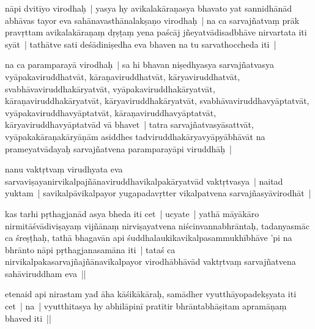 \documentclass[article,12pt,a4paper]{memoir}%
\newcounter{parCount}
\begin{document}
	  \pstart \leavevmode%
	\label{thakur75-23.28}nāpi dvitīyo virodhaḥ | yasya hy avikalakāraṇasya bhavato yat sannidhānād abhāvas tayor eva sahānavasthānalakṣaṇo virodhaḥ | na ca sarvajñatvaṃ prāk pravṛttam avikalakāraṇaṃ dṛṣṭaṃ yena paścāj jñeyatvādisadbhāve nirvartata iti syāt | tathātve sati deśādiniṣedha eva bhaven na tu sarvathoccheda iti | 
	{}
	\pend%
      

	  \pstart \leavevmode%
	\label{thakur75-23.32}na ca paramparayā virodhaḥ | sa hi bhavan niṣedhyasya sarvajñatvasya vyāpakaviruddhatvāt, kāraṇaviruddhatvāt, kāryaviruddhatvāt, svabhāvaviruddhakāryatvāt, vyāpakaviruddhakāryatvāt, kāraṇaviruddhakāryatvāt, kāryaviruddhakāryatvāt, svabhāvaviruddhavyāptatvāt, vyāpakaviruddhavyāptatvāt, kāraṇaviruddhavyāptatvāt, kāryaviruddhavyāptatvād vā bhavet | tatra sarvajñatvasyāsattvāt, vyāpakakāraṇakāryāṇām asiddhes tadviruddhakāryavyāpyābhāvāt na prameyatvādayaḥ sarvajñatvena paramparayāpi viruddhāḥ | 
	{}
	\pend%
      

	  \pstart \leavevmode%
	\label{thakur75-24.5}nanu vaktṛtvaṃ virudhyata eva sarvaviṣayanirvikalpajñānaviruddhavikalpakāryatvād vaktṛtvasya | naitad yuktam | savikalpāvikalpayor yugapadavṛtter vikalpatvena sarvajñasyāvirodhāt | 
	{}
	\pend%
      

	  \pstart \leavevmode%
	\label{thakur75-24.8}kas tarhi pṛthagjanād asya bheda iti cet | ucyate | yathā māyākāro nirmitāśvādiviṣayaṃ vijñānaṃ nirviṣayatvena niścinvannabhrāntaḥ, tadanyasmāc ca śreṣṭhaḥ, tathā bhagavān api śuddhalaukikavikalpasammukhībhāve 'pi na bhrānto nāpi pṛthagjanasamāna iti | tataś ca nirvikalpakasarvajñajñānavikalpayor virodhābhāvād vaktṛtvaṃ sarvajñatvena sahāviruddham eva || 
	{}
	\pend%
      

	  \pstart \leavevmode%
	\label{thakur75-24.13}etenaid api nirastam yad āha kāśikākāraḥ, samādher vyutthāyopadekṣyata iti cet | na | vyutthitasya hy abhilāpinī pratītir bhrāntabhāṣitam apramāṇaṃ bhaved iti || 
	{}
	\pend%
      
\end{document}
